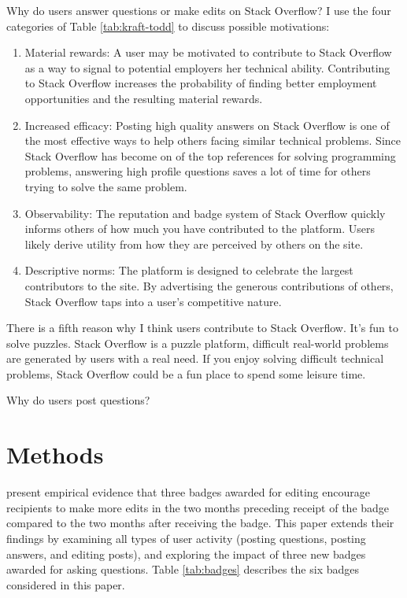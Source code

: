 \documentclass[conference]{IEEEtran}
\newcommand{\1}{\mathds{1}}
\begin{document}
Why do users answer questions or make edits on Stack Overflow? I use
the four categories of Table \ref{tab:kraft-todd} to discuss possible
motivations:
\begin{enumerate}
\item Material rewards: A user may be motivated to contribute to Stack
Overflow as a way to signal to potential employers her technical
ability. Contributing to Stack Overflow increases the probability of
finding better employment opportunities and the resulting material
rewards.
\item Increased efficacy: Posting high quality answers on Stack Overflow is
one of the most effective ways to help others facing similar technical
problems. Since Stack Overflow has become on of the top references for
solving programming problems, answering high profile questions saves a
lot of time for others trying to solve the same problem.
\item Observability: The reputation and badge system of Stack Overflow
quickly informs others of how much you have contributed to the
platform. Users likely derive utility from how they are perceived by
others on the site.
\item Descriptive norms: The platform is designed to celebrate the largest
contributors to the site. By advertising the generous contributions of
others, Stack Overflow taps into a user's competitive nature.
\end{enumerate}
There is a fifth reason why I think users contribute to Stack
Overflow. It's fun to solve puzzles. Stack Overflow is a puzzle
platform, difficult real-world problems are generated by users with a
real need. If you enjoy solving difficult technical problems, Stack
Overflow could be a fun place to spend some leisure time.

Why do users post questions?

\section{Methods}

\citet{Grant2013} present empirical evidence that three badges awarded for editing encourage recipients to make more edits in the two months preceding receipt of the badge compared to the two months after receiving the badge. This paper extends their findings by examining all types of user activity (posting questions, posting answers, and editing posts), and exploring the impact of three new badges awarded for asking questions. Table \ref{tab:badges} describes the six badges considered in this paper.
\end{document}
